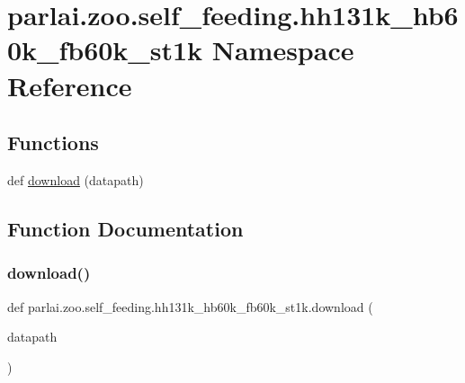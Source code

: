 \hypertarget{namespaceparlai_1_1zoo_1_1self__feeding_1_1hh131k__hb60k__fb60k__st1k}{}\section{parlai.\+zoo.\+self\+\_\+feeding.\+hh131k\+\_\+hb60k\+\_\+fb60k\+\_\+st1k Namespace Reference}
\label{namespaceparlai_1_1zoo_1_1self__feeding_1_1hh131k__hb60k__fb60k__st1k}
\subsection*{Functions}
\begin{DoxyCompactItemize}
\item 
def \hyperlink{namespaceparlai_1_1zoo_1_1self__feeding_1_1hh131k__hb60k__fb60k__st1k_a5e051a30e8d35df6f02340333024100b}{download} (datapath)
\end{DoxyCompactItemize}


\subsection{Function Documentation}
\mbox{\label{namespaceparlai_1_1zoo_1_1self__feeding_1_1hh131k__hb60k__fb60k__st1k_a5e051a30e8d35df6f02340333024100b}} 
\subsubsection{\texorpdfstring{download()}{download()}}
{\footnotesize\ttfamily def parlai.\+zoo.\+self\+\_\+feeding.\+hh131k\+\_\+hb60k\+\_\+fb60k\+\_\+st1k.\+download (\begin{DoxyParamCaption}\item[{}]{datapath }\end{DoxyParamCaption})}

